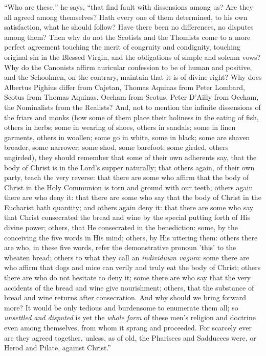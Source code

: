 ``Who are these,'' he says, ``that find fault with
dissensions among us? Are they all agreed among themselves? Hath every
one of them determined, to his own satisfaction, what he should
follow? Have there been no differences, no disputes among them? Then
why do not the Scotists and the Thomists come to a more perfect
agreement touching the merit of congruity and condignity, touching
original sin in the Blessed Virgin, and the obligations of simple and
solemn vows? Why do the Canonists affirm auricular confession to be of
human and positive, and the Schoolmen, on the contrary, maintain that
it is of divine right? Why does Albertus Pighius differ from Cajetan,
Thomas Aquinas from Peter Lombard, Scotus from Thomas Aquinas, Occham
from Scotus, Peter D'Ailly from Occham, the Nominalists from the
Realists? And, not to mention the infinite dissensions of the friars
and monks (how some of them place their holiness in the eating of
fish, others in herbs; some in wearing of shoes, others in sandals;
some in linen garments, others in woollen; some go in white, some in
black; some are shaven broader, some narrower; some shod, some
barefoot; some girded, others ungirded), they should remember that
some of their own adherents say, that the body of Christ is in the
Lord's supper naturally; that others again, of their own party, teach
the very reverse: that there are some who affirm that the body of
Christ in the Holy Communion is torn and ground with our teeth; others
again there are who deny it: that there are some who say that the body
of Christ in the Eucharist hath quantity; and others again deny it:
that there are some who say that Christ consecrated the bread and wine
by the special putting forth of His divine power; others, that He
consecrated in the benediction: some, by the conceiving the five words
in His mind; others, by His uttering them: others there are who, in
these five words, refer the demonstrative pronoun 'this' to the
wheaten bread; others to what they call an \emph{individuum vagum}:
some there are who affirm that dogs and mice can verily and truly eat
the body of Christ; others there are who do not hesitate to deny it;
some there are who say that the very accidents of the bread and wine
give nourishment; others, that the substance of bread and wine returns
after consecration. And why should we bring forward more? It would be
only tedious and burdensome to enumerate them all; so \emph{unsettled and
disputed} is yet the \emph{whole form} of these men's religion and
doctrine even among themselves, from whom it sprang and proceeded. For
scarcely ever are they agreed together, unless, as of old, the
Pharisees and Sadducees were, or Herod and Pilate, against
Christ.''


